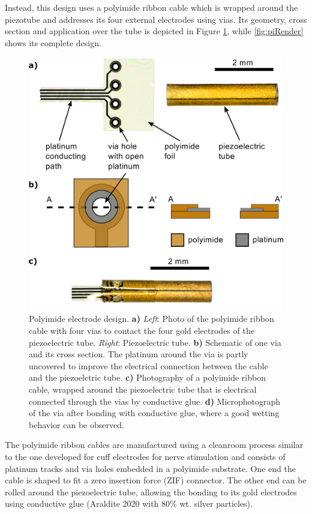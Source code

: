 \documentclass[10pt]{iopart}
\begin{document}
Instead, this design uses a polyimide ribbon cable which is wrapped around the piezotube and addresses its four external electrodes using vias. Its geometry, cross section and application over the tube is depicted in Figure \ref{fig:piRolled}, while \autoref{fig:piRender} shows its complete design.

\begin{figure}[h!]\centering \includegraphics[width=\columnwidth]{figures/tubeFoil.png}
      \caption{Polyimide electrode design.
      \textbf{a)} \textit{Left}: Photo of the polyimide ribbon cable with four vias to contact the four gold electrodes of the piezoelectric tube. \textit{Right}: Piezoelectric tube.
      \textbf{b)} Schematic of one via and its cross section. The platinum around the via is partly uncovered to improve the electrical connection between the cable and the piezoelctric tube.
      \textbf{c)} Photography of a polyimide ribbon cable, wrapped around the piezoelectric tube that is electrical connected through the vias by conductive glue.
      \textbf{d)} Microphotograph of the via after bonding with conductive glue, where a good wetting behavior can be observed.}
      \label{fig:piRolled}
\end{figure}

The polyimide ribbon cables are manufactured using a cleanroom process similar to the one developed for cuff electrodes for nerve stimulation \cite{Rodriguez2000} and consists of platinum tracks and via holes embedded in a polyimide substrate. One end the cable is shaped to fit a zero insertion force (ZIF) connector. The other end can be rolled around the piezoelectric tube, allowing the bonding to its gold electrodes using conductive glue (Araldite 2020 with 80\% wt. silver particles).
\end{document}
